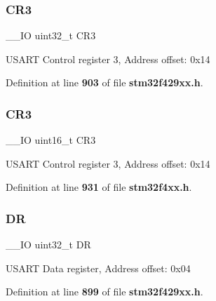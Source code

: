 \mbox{\label{structUSART__TypeDef_add5b8e29a64c55dcd65ca4201118e9d1}} 
\subsubsection{C\+R3\hspace{0.1cm}{\footnotesize\ttfamily [1/2]}}
{\footnotesize\ttfamily \+\_\+\+\_\+\+IO uint32\+\_\+t C\+R3}

U\+S\+A\+RT Control register 3, Address offset\+: 0x14 

Definition at line \textbf{ 903} of file \textbf{ stm32f429xx.\+h}.

\mbox{\label{structUSART__TypeDef_a9651ce2df8eec57b9cab2f27f6dbf3e1}} 
\subsubsection{C\+R3\hspace{0.1cm}{\footnotesize\ttfamily [2/2]}}
{\footnotesize\ttfamily \+\_\+\+\_\+\+IO uint16\+\_\+t C\+R3}

U\+S\+A\+RT Control register 3, Address offset\+: 0x14 

Definition at line \textbf{ 931} of file \textbf{ stm32f4xx.\+h}.

\mbox{\label{structUSART__TypeDef_a3df0d8dfcd1ec958659ffe21eb64fa94}} 
\subsubsection{DR\hspace{0.1cm}{\footnotesize\ttfamily [1/2]}}
{\footnotesize\ttfamily \+\_\+\+\_\+\+IO uint32\+\_\+t DR}

U\+S\+A\+RT Data register, Address offset\+: 0x04 

Definition at line \textbf{ 899} of file \textbf{ stm32f429xx.\+h}.

\mbox{\label{structUSART__TypeDef_a0a1acc0425516ff7969709d118b96a3b}} 
